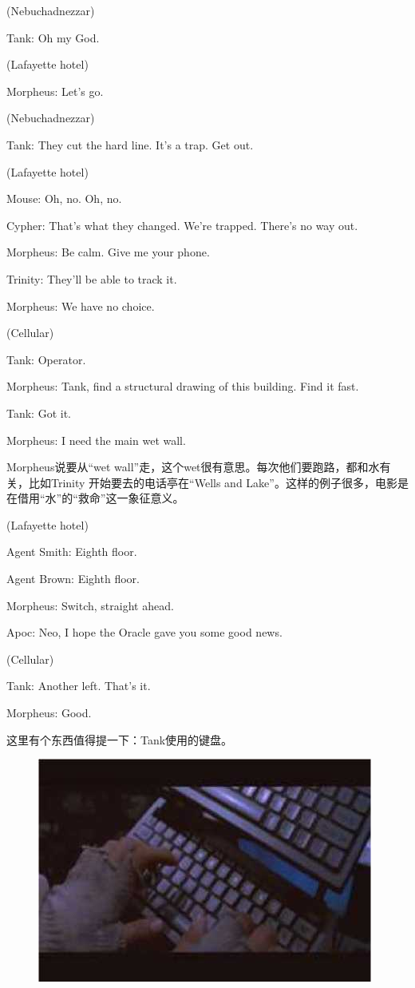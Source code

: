 \documentclass[UTF8]{ctexart}
\newenvironment{myquote}{\color{green} \setlength{\leftskip}{6em} \setlength{\rightskip}{4em} \setlength{\parindent}{-2em}}{\par}
\begin{document}
\begin{myquote}
(Nebuchadnezzar)

Tank: Oh my God.

(Lafayette hotel)

Morpheus: Let's go.

(Nebuchadnezzar)

Tank: They cut the hard line. It's a trap. Get out.

(Lafayette hotel)

Mouse: Oh, no. Oh, no.

Cypher: That's what they changed. We're trapped. There's no way out.

Morpheus: Be calm. Give me your phone.

Trinity: They'll be able to track it.

Morpheus: We have no choice.

(Cellular)

Tank: Operator.

Morpheus: Tank, find a structural drawing of this building. Find it fast.

Tank: Got it.

Morpheus: I need the main wet wall.
\end{myquote}

Morpheus说要从“wet wall”走，这个wet很有意思。每次他们要跑路，都和水有关，比如Trinity 开始要去的电话亭在“Wells and Lake”。这样的例子很多，电影是在借用“水”的“救命”这一象征意义。

\begin{myquote}
(Lafayette hotel)

Agent Smith: Eighth floor.

Agent Brown: Eighth floor.

Morpheus: Switch, straight ahead.

Apoc: Neo, I hope the Oracle gave you some good news.

(Cellular)

Tank: Another left. That's it.

Morpheus: Good.
\end{myquote}

这里有个东西值得提一下：Tank使用的键盘。

\begin{figure}[htb]
\centering
\includegraphics[width=0.5\linewidth]{fig/read_Matrix-55}
\end{figure}
\end{document}
